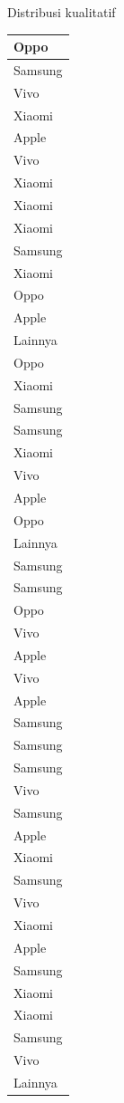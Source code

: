 \documentclass[
  ignorenonframetext,
]{beamer}
\begin{document}
\begin{frame}[s]{Distribusi kualitatif}
\begin{table}
\begin{tabular}[t]{l}
\hline
Oppo\\
\hline
Samsung\\
\hline
Vivo\\
\hline
Xiaomi\\
\hline
Apple\\
\hline
Vivo\\
\hline
Xiaomi\\
\hline
Xiaomi\\
\hline
Xiaomi\\
\hline
Samsung\\
\hline
Xiaomi\\
\hline
Oppo\\
\hline
Apple\\
\hline
Lainnya\\
\hline
Oppo\\
\hline
Xiaomi\\
\hline
Samsung\\
\hline
Samsung\\
\hline
Xiaomi\\
\hline
Vivo\\
\hline
Apple\\
\hline
Oppo\\
\hline
Lainnya\\
\hline
Samsung\\
\hline
Samsung\\
\hline
Oppo\\
\hline
Vivo\\
\hline
Apple\\
\hline
Vivo\\
\hline
Apple\\
\hline
Samsung\\
\hline
Samsung\\
\hline
Samsung\\
\hline
Vivo\\
\hline
Samsung\\
\hline
Apple\\
\hline
Xiaomi\\
\hline
Samsung\\
\hline
Vivo\\
\hline
Xiaomi\\
\hline
Apple\\
\hline
Samsung\\
\hline
Xiaomi\\
\hline
Xiaomi\\
\hline
Samsung\\
\hline
Vivo\\
\hline
Lainnya\\

\end{tabular}
\end{table}
\end{frame}
\end{document}

